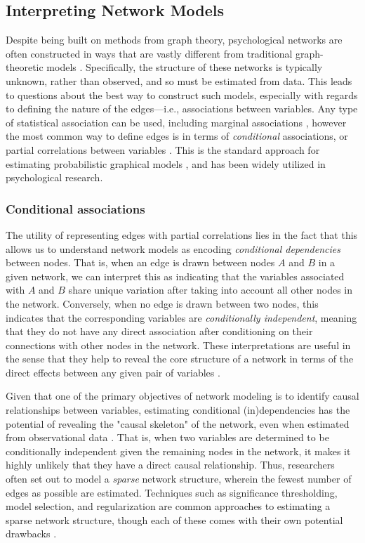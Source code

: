 \subsection{Interpreting Network Models}
Despite being built on methods from graph theory, psychological networks are often constructed in ways that are vastly different from traditional graph-theoretic models \cite{epskamp2018estimating}. Specifically, the structure of these networks is typically unknown, rather than observed, and so must be estimated from data. This leads to questions about the best way to construct such models, especially with regards to defining the nature of the edges---i.e., associations between variables. Any type of statistical association can be used, including marginal associations \cite{forbush2016ed,siew2019using}, however the most common way to define edges is in terms of \textit{conditional} associations, or partial correlations between variables \cite{epskamp2018tutorial,williams2019nonregularized}. This is the standard approach for estimating probabilistic graphical models \cite{lauritzen1996graphical}, and has been widely utilized in psychological research. 

\subsubsection{Conditional associations}
The utility of representing edges with partial correlations lies in the fact that this allows us to understand network models as encoding \textit{conditional dependencies} between nodes. That is, when an edge is drawn between nodes $A$ and $B$ in a given network, we can interpret this as indicating that the variables associated with $A$ and $B$ share unique variation after taking into account all other nodes in the network. Conversely, when no edge is drawn between two nodes, this indicates that the corresponding variables are \textit{conditionally independent}, meaning that they do not have any direct association after conditioning on their connections with other nodes in the network. These interpretations are useful in the sense that they help to reveal the core structure of a network in terms of the direct effects between any given pair of variables \cite{van2015association,haslbeck2017predictable}. 

Given that one of the primary objectives of network modeling is to identify causal relationships between variables, estimating conditional (in)dependencies has the potential of revealing the "causal skeleton" of the network, even when estimated from observational data \cite{mcnally2015mental,boschloo2016network}. That is, when two variables are determined to be conditionally independent given the remaining nodes in the network, it makes it highly unlikely that they have a direct causal relationship. Thus, researchers often set out to model a \textit{sparse} network structure, wherein the fewest number of edges as possible are estimated. Techniques such as significance thresholding, model selection, and regularization are common approaches to estimating a sparse network structure, though each of these comes with their own potential drawbacks \cite{epskamp2018estimating}. 

